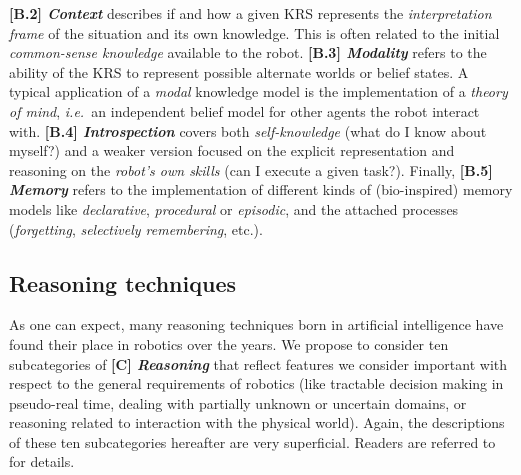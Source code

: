 \documentclass[journal]{IEEEtran}
\newcommand{\ie}{{\textit{i.e.\ }}}
\newcommand{\taxon}[2]{%
    \textbf{[#1] \emph{#2}}
}
\begin{document}
\taxon{B.2}{Context} describes if and how a given KRS represents the
\emph{interpretation frame} of the situation and its own knowledge. This is
often related to the initial \emph{common-sense knowledge} available to the
robot. \taxon{B.3}{Modality} refers to the ability of the KRS to represent
possible alternate worlds or belief states. A typical application of a
\emph{modal} knowledge model is the implementation of a \emph{theory of mind},
\ie an independent belief model for other agents the robot interact with.
\taxon{B.4}{Introspection} covers both \emph{self-knowledge} (what do I know
about myself?) and a weaker version focused on the explicit representation and
reasoning on the \emph{robot's own skills} (can I execute a given task?).
Finally, \taxon{B.5}{Memory} refers to the implementation of
different kinds of (bio-inspired) memory models like \emph{declarative},
\emph{procedural} or \emph{episodic}, and the attached processes
(\emph{forgetting}, \emph{selectively remembering}, etc.).


\subsection{Reasoning techniques}
\label{sect|reasoning}

As one can expect, many reasoning techniques born in artificial intelligence
have found their place in robotics over the years. We propose to consider ten
subcategories of \taxon{C}{Reasoning} that reflect features we consider 
important with respect to the general requirements of robotics (like tractable 
decision making in pseudo-real time, dealing with partially unknown or uncertain 
domains, or reasoning related to interaction with the physical world). Again, 
the descriptions of these ten subcategories hereafter are very superficial. 
Readers are referred to~\cite{lemaignan2012symbolic} for details.
\end{document}
